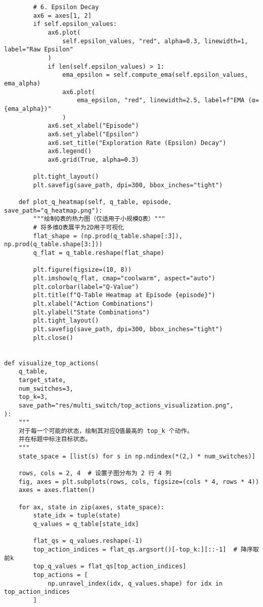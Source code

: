 \begin{verbatim}
        # 6. Epsilon Decay
        ax6 = axes[1, 2]
        if self.epsilon_values:
            ax6.plot(
                self.epsilon_values, "red", alpha=0.3, linewidth=1, label="Raw Epsilon"
            )
            if len(self.epsilon_values) > 1:
                ema_epsilon = self.compute_ema(self.epsilon_values, ema_alpha)
                ax6.plot(
                    ema_epsilon, "red", linewidth=2.5, label=f"EMA (α={ema_alpha})"
                )
            ax6.set_xlabel("Episode")
            ax6.set_ylabel("Epsilon")
            ax6.set_title("Exploration Rate (Epsilon) Decay")
            ax6.legend()
            ax6.grid(True, alpha=0.3)

        plt.tight_layout()
        plt.savefig(save_path, dpi=300, bbox_inches="tight")

    def plot_q_heatmap(self, q_table, episode, save_path="q_heatmap.png"):
        """绘制Q表的热力图（仅适用于小规模Q表）"""
        # 将多维Q表展平为2D用于可视化
        flat_shape = (np.prod(q_table.shape[:3]), np.prod(q_table.shape[3:]))
        q_flat = q_table.reshape(flat_shape)

        plt.figure(figsize=(10, 8))
        plt.imshow(q_flat, cmap="coolwarm", aspect="auto")
        plt.colorbar(label="Q-Value")
        plt.title(f"Q-Table Heatmap at Episode {episode}")
        plt.xlabel("Action Combinations")
        plt.ylabel("State Combinations")
        plt.tight_layout()
        plt.savefig(save_path, dpi=300, bbox_inches="tight")
        plt.close()


def visualize_top_actions(
    q_table,
    target_state,
    num_switches=3,
    top_k=3,
    save_path="res/multi_switch/top_actions_visualization.png",
):
    """
    对于每一个可能的状态，绘制其对应Q值最高的 top_k 个动作。
    并在标题中标注目标状态。
    """
    state_space = [list(s) for s in np.ndindex(*(2,) * num_switches)]

    rows, cols = 2, 4  # 设置子图分布为 2 行 4 列
    fig, axes = plt.subplots(rows, cols, figsize=(cols * 4, rows * 4))
    axes = axes.flatten()

    for ax, state in zip(axes, state_space):
        state_idx = tuple(state)
        q_values = q_table[state_idx]

        flat_qs = q_values.reshape(-1)
        top_action_indices = flat_qs.argsort()[-top_k:][::-1]  # 降序取前k
        top_q_values = flat_qs[top_action_indices]
        top_actions = [
            np.unravel_index(idx, q_values.shape) for idx in top_action_indices
        ]


\end{verbatim}
